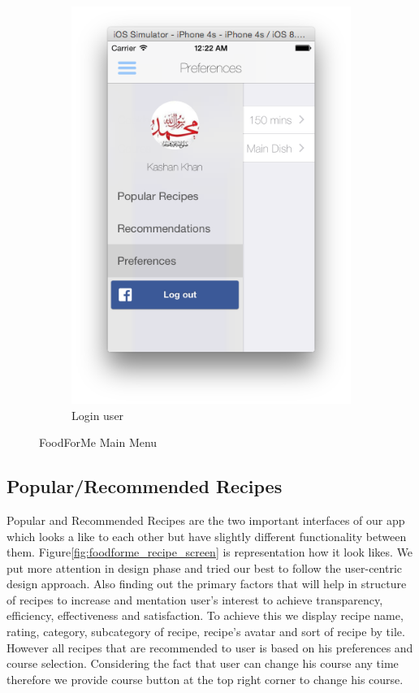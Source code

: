 \begin{figure}[h]
\begin{subfigure}{.49\textwidth}
		\includegraphics[width=.9\linewidth]{figures/ch4_app_screen_shots/main_menu/main_menu_2.png}
		\caption{Login user}
		\label{foodforme_main_menu_screen_login}
	\end{subfigure}
	\caption{FoodForMe Main Menu}
	\label{fig:foodforme_main_menu_screen}
\end{figure}
	  
\subsection{Popular/Recommended Recipes}

Popular and Recommended Recipes are the two important interfaces of our app which looks a like to each other but have slightly different functionality between them. Figure\ref{fig:foodforme_recipe_screen} is representation how it look likes. We put more attention in design phase and tried our best to follow the user-centric design approach.  Also finding out the primary factors that will help in structure of recipes to increase and mentation user’s interest to achieve transparency, efficiency, effectiveness and satisfaction. To achieve this we display recipe name, rating, category, subcategory of recipe, recipe’s avatar and sort of recipe by tile. However all recipes that are recommended to user is based on his preferences and course selection. Considering the fact that user can change his course any time therefore we provide course button at the top right corner to change his course.


